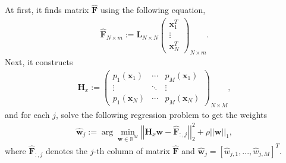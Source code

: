 At first, it finds matrix $\widehat{\textbf{F}}$ using the following equation, 
\begin{align*}
\widehat{\textbf{F}}_{N\times m}:=
\textbf{L}_{N\times N} \begin{pmatrix}
\textbf{x}^T_1 \\
\vdots  \\
\textbf{x}^T_{N} 
\end{pmatrix}_{N\times m}.
\end{align*}
Next, it constructs  
\begin{align*}
\textbf{H}_x:=\begin{pmatrix}
p_1(\textbf{x}_{1}) & \cdots & p_M(\textbf{x}_{1})\\
\vdots  &  \ddots & \vdots  \\
p_1(\textbf{x}_{N}) & \cdots & p_M(\textbf{x}_{N})
\end{pmatrix}_{N\times M},
\end{align*}
 and for each $j$, solve the following regression problem to get the weights
\begin{align*}
\widehat{\textbf{w}}_j :=\arg\min_{\textbf{w}\in\mathbb{R}^M}\left|\left|\textbf{H}_x \textbf{w} - \widehat{\textbf{F}}_{:,j} \right|\right|_2^2 + \rho ||\textbf{w}||_1,
\end{align*}
where $\widehat{\textbf{F}}_{:,j}$ denotes the $j$-th column of matrix $\widehat{\textbf{F}}$  and $\widehat{\textbf{w}}_j =[\hat{w}_{j,1}, ..., \hat{w}_{j,M}]^T$.

